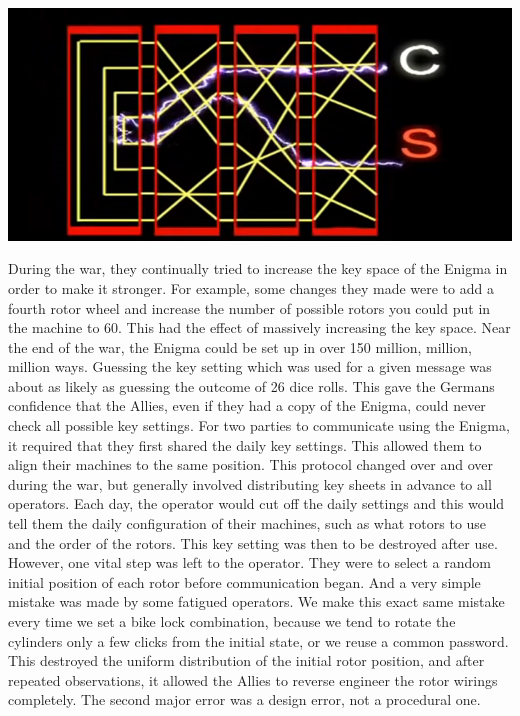 \documentclass{report}
\begin{document}
\begin{center}
	\includegraphics[scale=1]{8.png}
\end{center}
 During the war, they continually tried to increase the key space of the Enigma in order to make it stronger. For example, some changes they made were to add a fourth rotor wheel and increase the number of possible rotors you could put in the machine to 60. This had the effect of massively increasing the key space. Near the end of the war, the Enigma could be set up in over 150 million, million, million ways. Guessing the key setting which was used for a given message was about as likely as guessing the outcome of 26 dice rolls. This gave the Germans confidence that the Allies, even if they had a copy of the Enigma, could never check all possible key settings. For two parties to communicate using the Enigma, it required that they first shared the daily key settings. This allowed them to align their machines to the same position. This protocol changed over and over during the war, but generally involved distributing key sheets in advance to all operators. Each day, the operator would cut off the daily settings and this would tell them the daily configuration of their machines, such as what rotors to use and the order of the rotors. This key setting was then to be destroyed after use. However, one vital step was left to the operator. They were to select a random initial position of each rotor before communication began. And a very simple mistake was made by some fatigued operators. We make this exact same mistake every time we set a bike lock combination, because we tend to rotate the cylinders only a few clicks from the initial state, or we reuse a common password. This destroyed the uniform distribution of the initial rotor position, and after repeated observations, it allowed the Allies to reverse engineer the rotor wirings completely. The second major error was a design error, not a procedural one. \\
\end{document}
